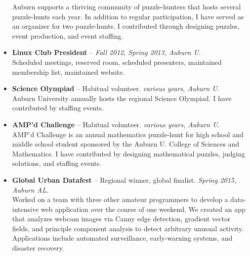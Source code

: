 \documentclass[11pt]{article}
\begin{document}
\begin{itemize}
        Auburn supports a thriving community of puzzle-hunters that
        hosts several puzzle-hunts each year. In addition to regular
        participation, I have served as an organizer for two
        puzzle-hunts. I contributed through designing puzzles, event
        production, and event staffing.
    \item{}
      {\bf Linux Club President} --
      {\em Fall 2012, Spring 2013, Auburn U.}\\
        Scheduled meetings, reserved room, scheduled presenters,
        maintained membership list, maintained website.
    \item{}
      {\bf Science Olympiad} --
      {Habitual volunteer.}
      {\em various years, Auburn U.}\\
        Auburn University annually hosts the regional Science Olympiad.
        I have contributed by staffing events.
    \item{}
      {\bf AMP'd Challenge} --
      {Habitual volunteer.}
      {\em various years, Auburn U.}\\
        AMP'd Challenge is an annual mathematics puzzle-hunt for high
        school and middle school student sponsored by the Auburn U.
        College of Sciences and Mathematics. I have contributed by
        designing mathematical puzzles, judging solutions, and staffing
        events.
    \item{}
      {\bf Global Urban Datafest} --
      {Regional winner, global finalist.}
      {\em Spring 2015, Auburn AL.}\\
        Worked on a team with three other amateur programmers to develop
        a data-intensive web application over the course of one weekend.
        We created an app that analyzes webcam images via Canny edge
        detection, gradient vector fields, and principle component
        analysis to detect arbitrary unusual activity. Applications
        include automated surveillance, early-warning systems, and
        disaster recovery.
  \end{itemize}

\label{page:last}
\end{document}
